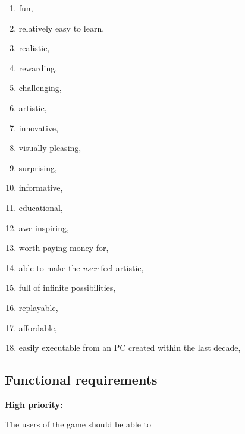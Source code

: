 \begin{multicols}{2}
\begin{enumerate}

  \item fun,

  \item relatively easy to learn,

  \item realistic,

  \item rewarding,

  \item challenging,
  
  \item artistic,
  
  \item innovative,
  
  \item visually pleasing,
  
  \item surprising,
  
  \item informative,
  
  \item educational,
  
  \item awe inspiring,
  
  \item worth paying money for,
  
  \item able to make the \emph{user} feel artistic,
  
  \item full of infinite possibilities,

  \item replayable,

  \item affordable,

  \item easily executable from an PC created within the last decade,

\end{enumerate}
\end{multicols}

\subsection*{Functional requirements}

\noindent \textbf{High priority:}

The users of the game should be able to

